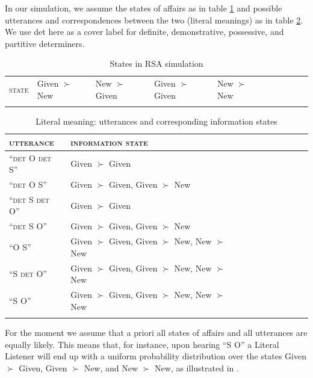 \documentclass[output=paper,modfonts,nonflat]{langsci/langscibook}
\begin{document}
In our simulation, we assume the states of affairs as in table \ref{states} and possible utterances and correspondences between the two (literal meanings) as in table \ref{table:meanings}. We use {\sc det} here as a cover label for definite, demonstrative, possessive, and partitive determiners.

\begin{table}
\begin{tabular}{llllllllll}
\lsptoprule
{\scshape state} & Given $\succ$ New & New $\succ$ Given & Given $\succ$ Given & New $\succ$ New \\
\lspbottomrule
\end{tabular}
\caption{States in RSA simulation}\label{states}
\end{table}

\begin{table}
\begin{tabular}{llllllllll}
\lsptoprule
{\scshape utterance} & {\scshape information state} \\\midrule
``{\scshape det} O {\scshape det} S'' & Given $\succ$ Given\\ 
``{\scshape det} O S'' & Given $\succ$ Given, Given $\succ$ New\\
``{\scshape det} S {\scshape det} O'' & Given $\succ$ Given\\
``{\scshape det} S O'' & Given $\succ$ Given, Given $\succ$ New\\
``O S'' & Given $\succ$ Given, Given $\succ$ New, New $\succ$ New\\
``S {\scshape det} O'' & Given $\succ$ Given, Given $\succ$ New, New $\succ$ New\\
``S O'' & Given $\succ$ Given, Given $\succ$ New, New $\succ$ New\\
\lspbottomrule
\end{tabular}
\caption{Literal meaning: utterances and corresponding information states}\label{table:meanings}
\end{table}

For the moment we assume that a priori all states of affairs and all utterances are equally likely. This means that, for instance, upon hearing ``S O'' a Literal Listener will end up with a uniform probability distribution over the states Given $\succ$ Given, Given $\succ$ New, and New $\succ$ New, as illustrated in .
\end{document}
